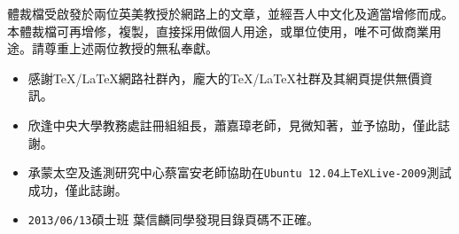\begin{acknowledgements} 

體裁檔受啟發於兩位英美教授於網路上的文章，並經吾人中文化及適當增修而成。本體裁檔可再增修，複製，直接採用做個人用途，或單位使用，唯不可做商業用途。請尊重上述兩位教授的無私奉獻。

\begin{itemize}
\item 感謝\TeX/\LaTeX{}網路社群內，龐大的\TeX/\LaTeX 社群及其網頁提供無價資訊。
\item 欣逢中央大學教務處註冊組組長，蕭嘉璋老師，見微知著，並予協助，僅此誌謝。
\item 承蒙太空及遙測研究中心蔡富安老師協助在{\tt Ubuntu 12.04上TeXLive-2009}測試成功，僅此誌謝。
\item \texttt{2013/06/13}碩士班 葉信麟同學發現目錄頁碼不正確。
\end{itemize}
\end{acknowledgements} 